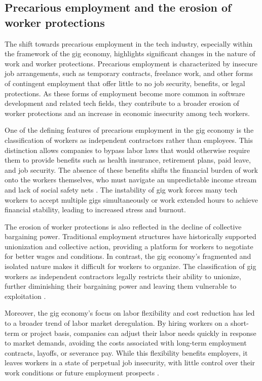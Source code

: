 \begin{refsection}
\subsection{Precarious employment and the erosion of worker protections}

The shift towards precarious employment in the tech industry, especially within the framework of the gig economy, highlights significant changes in the nature of work and worker protections. Precarious employment is characterized by insecure job arrangements, such as temporary contracts, freelance work, and other forms of contingent employment that offer little to no job security, benefits, or legal protections. As these forms of employment become more common in software development and related tech fields, they contribute to a broader erosion of worker protections and an increase in economic insecurity among tech workers.

One of the defining features of precarious employment in the gig economy is the classification of workers as independent contractors rather than employees. This distinction allows companies to bypass labor laws that would otherwise require them to provide benefits such as health insurance, retirement plans, paid leave, and job security. The absence of these benefits shifts the financial burden of work onto the workers themselves, who must navigate an unpredictable income stream and lack of social safety nets \cite[pp.~1-3]{kalleberg2011precarious}. The instability of gig work forces many tech workers to accept multiple gigs simultaneously or work extended hours to achieve financial stability, leading to increased stress and burnout.

The erosion of worker protections is also reflected in the decline of collective bargaining power. Traditional employment structures have historically supported unionization and collective action, providing a platform for workers to negotiate for better wages and conditions. In contrast, the gig economy's fragmented and isolated nature makes it difficult for workers to organize. The classification of gig workers as independent contractors legally restricts their ability to unionize, further diminishing their bargaining power and leaving them vulnerable to exploitation \cite[pp.~119-122]{marsden2017platform}.

Moreover, the gig economy's focus on labor flexibility and cost reduction has led to a broader trend of labor market deregulation. By hiring workers on a short-term or project basis, companies can adjust their labor needs quickly in response to market demands, avoiding the costs associated with long-term employment contracts, layoffs, or severance pay. While this flexibility benefits employers, it leaves workers in a state of perpetual job insecurity, with little control over their work conditions or future employment prospects \cite[pp.~145-148]{fleming2017revolt}.


\end{refsection}
